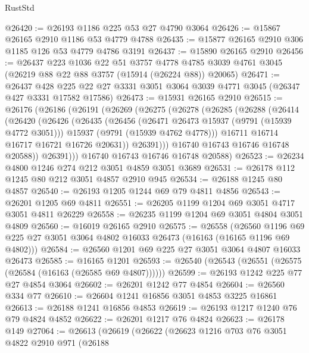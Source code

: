 \begin{lexlean}{RustStd}
\begin{coremodule}
@26420 := @26193 @1186 @225 @53 @27 @4790 @3064
@26426 := @15867 @26165 @2910 @1186 @53 @4779 @4788
@26435 := @15877 @26165 @2910 @306 @1185 @126 @53 @4779 @4786 @3191
@26437 := @15890 @26165 @2910
@26456 := @26437
    @223
    @1036
    @22
    @51
    @3757
    @4778
    @4785
    @3039
    @4761
    @3045
    (@26219 @88 @22 @88 @3757 (@15914 (@26224 @88)) @20065)
@26471 := @26437
    @428
    @225
    @22
    @27
    @3331
    @3051
    @3064
    @3039
    @4771
    @3045
    (@26347 @427 @3331 @17582 @17586)
@26473 := @15931 @26165 @2910
@26515 := @26176
    (@26186
      (@26191
        (@26269
          (@26275
            (@26278
              (@26285
                (@26288
                  (@26414
                    (@26420
                      (@26426
                        (@26435
                          (@26456
                            (@26471 @26473 @15937 (@9791 (@15939 @4772 @3051)))
                            @15937
                            (@9791 (@15939 @4762 @4778)))
                          @16711
                          @16714
                          @16717
                          @16721
                          @16726
                          @20631))
                      @26391)))
                @16740
                @16743
                @16746
                @16748
                @20588))
            @26391)))
      @16740
      @16743
      @16746
      @16748
      @20588)
@26523 := @26234 @4800 @1246 @274 @212 @3051 @4859 @3051 @3689
@26531 := @26178 @112 @1245 @80 @212 @3051 @4857 @2910 @945
@26534 := @26188 @1245 @80 @4857
@26540 := @26193 @1205 @1244 @69 @79 @4811 @4856
@26543 := @26201 @1205 @69 @4811
@26551 := @26205 @1199 @1204 @69 @3051 @4717 @3051 @4811 @26229
@26558 := @26235 @1199 @1204 @69 @3051 @4804 @3051 @4809
@26560 := @16019 @26165 @2910
@26575 := @26558
    (@26560 @1196 @69 @225 @27 @3051 @3064 @4802 @16033 @26473 (@16163 (@16165 @1196 @69 @4802)))
@26584 := @26560 @1201 @69 @225 @27 @3051 @3064 @4807 @16033 @26473
@26585 := @16165 @1201
@26593 := @26540 (@26543 (@26551 (@26575 (@26584 (@16163 (@26585 @69 @4807))))))
@26599 := @26193 @1242 @225 @77 @27 @4854 @3064
@26602 := @26201 @1242 @77 @4854
@26604 := @26560 @334 @77
@26610 := @26604 @1241 @16856 @3051 @4853 @3225 @16861
@26613 := @26188 @1241 @16856 @4853
@26619 := @26193 @1217 @1240 @76 @79 @4824 @4852
@26622 := @26201 @1217 @76 @4824
@26623 := @26178 @149
@27064 := @26613
    (@26619
      (@26622
        (@26623
          @1216
          @703
          @76
          @3051
          @4822
          @2910
          @971
          (@26188

\end{coremodule}
\end{lexlean}

